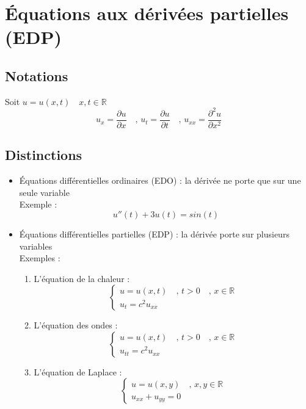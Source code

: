 \section{Équations aux dérivées partielles (EDP)}
\subsection{Notations}
Soit $u = u(x,t) \quad x,t \in \mathbb{R}$ \\
$$u_x = \frac{\partial u}{\partial x} \quad \text{, } u_t = \frac{\partial u}{\partial t} \quad \text{, } u_{xx} = \frac{\partial^2 u}{\partial x^2}$$

\subsection{Distinctions}
\begin{itemize}
    \item Équations différentielles ordinaires (EDO) : la dérivée ne porte que sur une seule variable \\
    Exemple :
    $$u''(t)+3u(t) = sin(t)$$
    \item Équations différentielles partielles (EDP) : la dérivée porte sur plusieurs variables \\
    Exemples :
    \begin{enumerate}
        \item L'équation de la chaleur :
        $$
        \begin{cases}
            u = u(x,t) \quad \text{, }t > 0 \quad \text{, }x \in \mathbb{R} \\
            u_t = c^2u_{xx}
        \end{cases}
        $$
        \item L'équation des ondes :
        $$
        \begin{cases}
            u = u(x,t) \quad \text{, }t > 0 \quad \text{, }x \in \mathbb{R} \\
            u_{tt} = c^2u_{xx}
        \end{cases}
        $$
        \item L'équation de Laplace :
        $$
        \begin{cases}
            u = u(x,y) \quad \text{, }x,y \in \mathbb{R} \\
            u_{xx} + u_{yy} = 0
        \end{cases}
        $$
    \end{enumerate}
\end{itemize}

